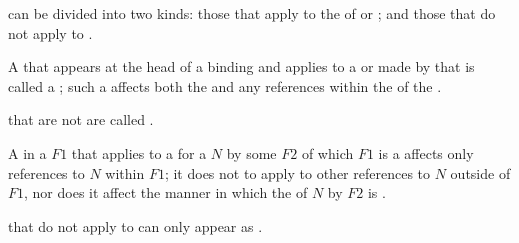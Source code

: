 \endsubsubsection%

\endSubsection%


% 
%

 can be divided into two kinds: those that apply to the
 of  or ; and those that
do not apply to .

A  that appears at the head of a binding  
and applies to a  or   
made by that  is called a ; 
such a  affects both the  and
any references within the  of the .  

 that are not  are called
.

A  in a  $F1$ that applies to a 
for a  $N$  by some  $F2$
of which $F1$ is a 
affects only references to $N$ within $F1$; it does not to apply to
other references to $N$ outside of $F1$, nor does it affect the manner
in which the  of $N$ by $F2$ is .

 that do not apply to  can only appear 
as .


